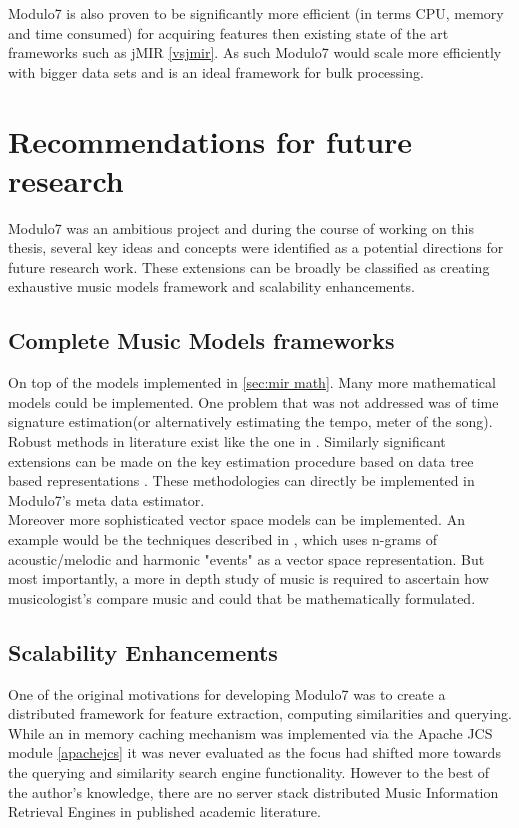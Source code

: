 \noindent Modulo7 is also proven to be significantly more efficient (in terms CPU, memory and time consumed) for acquiring features then existing state of the art frameworks such as jMIR \ref{vsjmir}. As such Modulo7 would scale more efficiently with bigger data sets and is an ideal framework for bulk processing.  

\section{Recommendations for future research}

\noindent Modulo7 was an ambitious project and during the course of working on this thesis, several key ideas and concepts were identified as a potential directions for future research work. These extensions can be broadly be classified as creating exhaustive music models framework and scalability enhancements.

\subsection{Complete Music Models frameworks}

\noindent On top of the models implemented in \ref{sec:mir math}. Many more mathematical models could be implemented. One problem that was not addressed was of time signature estimation(or alternatively estimating the tempo, meter of the song). Robust methods in literature exist like the one in \cite{tempoestimation}. Similarly significant extensions can be made on the key estimation procedure based on data tree based representations \cite{treemodel}. These methodologies can directly be implemented in Modulo7's meta data estimator. \\

\noindent Moreover more sophisticated vector space models can be implemented. An example would be the techniques described in \cite{eventbasedvectormodel}, which uses n-grams of acoustic/melodic and harmonic "events" as a vector space representation. But most importantly, a more in depth study of music is required to ascertain how musicologist's compare music and could that be mathematically formulated. 

\subsection{Scalability Enhancements}

\noindent One of the original motivations for developing Modulo7 was to create a distributed framework for feature extraction, computing similarities and querying. While an in memory caching mechanism was implemented via the Apache JCS module \ref{apachejcs} it was never evaluated as the focus had shifted more towards the querying and similarity search engine functionality. However to the best of the author's knowledge, there are no server stack distributed Music Information Retrieval Engines in published academic literature. \\


